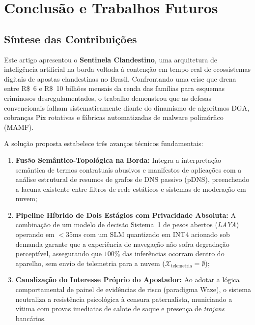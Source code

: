 \section{Conclus\~{a}o e Trabalhos Futuros}
\label{sec:conclusao}

\subsection{S\'{i}ntese das Contribui\c{c}\~{o}es}

Este artigo apresentou o \textbf{Sentinela Clandestino}, uma arquitetura de intelig\^{e}ncia artificial na borda voltada \`{a} conten\c{c}\~{a}o em tempo real de ecossistemas digitais de apostas clandestinas no Brasil. Confrontando uma crise que drena entre R\$~6 e R\$~10 bilh\~{o}es mensais da renda das fam\'{i}lias para esquemas criminosos desregulamentados, o trabalho demonstrou que as defesas convencionais falham sistematicamente diante do dinamismo de algoritmos DGA, cobran\c{c}as Pix rotativas e f\'{a}bricas automatizadas de malware polim\'{o}rfico (MAMF).

A solu\c{c}\~{a}o proposta estabelece tr\^{e}s avan\c{c}os t\'{e}cnicos fundamentais:
\begin{enumerate}
    \item \textbf{Fus\~{a}o Sem\^{a}ntico-Topol\'{o}gica na Borda:} Integra a interpreta\c{c}\~{a}o sem\^{a}ntica de termos contratuais abusivos e manifestos de aplica\c{c}\~{o}es com a an\'{a}lise estrutural de resumos de grafos de DNS passivo (pDNS), preenchendo a lacuna existente entre filtros de rede est\'{a}ticos e sistemas de modera\c{c}\~{a}o em nuvem;
    \item \textbf{Pipeline H\'{i}brido de Dois Est\'{a}gios com Privacidade Absoluta:} A combina\c{c}\~{a}o de um modelo de decis\~{a}o Sistema~1 de pesos abertos (\textit{LAYA}) operando em $< 35\text{ms}$ com um SLM quantizado em INT4 acionado sob demanda garante que a experi\^{e}ncia de navega\c{c}\~{a}o n\~{a}o sofra degrada\c{c}\~{a}o percept\'{i}vel, assegurando que $100\%$ das infer\^{e}ncias ocorram dentro do aparelho, sem envio de telemetria para a nuvem ($\mathcal{X}_{\text{telemetria}} = \emptyset$);
    \item \textbf{Canaliza\c{c}\~{a}o do Interesse Pr\'{o}prio do Apostador:} Ao adotar a l\'{o}gica comportamental de painel de evid\^{e}ncias de risco (paradigma Waze), o sistema neutraliza a resist\^{e}ncia psicol\'{o}gica \`{a} censura paternalista, municiando a v\'{i}tima com provas imediatas de calote de saque e presen\c{c}a de \textit{trojans} banc\'{a}rios.
\end{enumerate}

